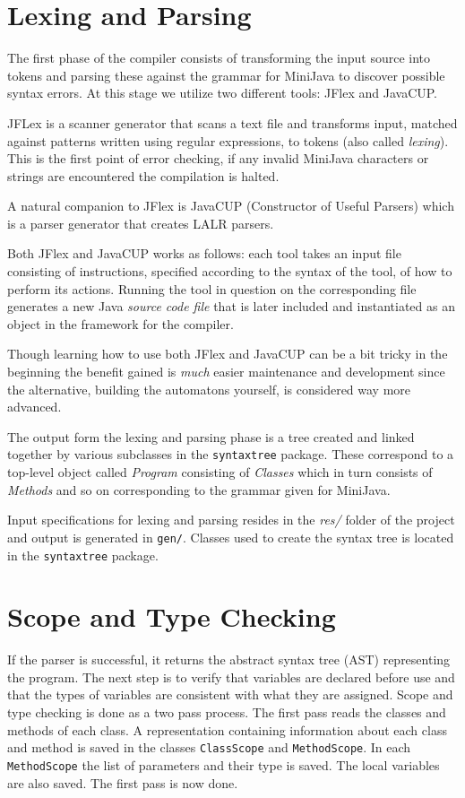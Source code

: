 \documentclass[11pt]{amsart}
\begin{document}
\section{Lexing and Parsing}
The first phase of the compiler consists of transforming the input source into tokens and parsing these against the grammar for MiniJava to discover possible syntax errors. At this stage we utilize two different tools: JFlex and JavaCUP. 

JFLex is a scanner generator that scans a text file and transforms input, matched against patterns written using regular expressions, to tokens (also called \textit{lexing}). This is the first point of error checking, if any invalid MiniJava characters or strings are encountered the compilation is halted.

A natural companion to JFlex is JavaCUP (Constructor of Useful Parsers) which is a parser generator that creates LALR parsers\cite{appel}.

Both JFlex and JavaCUP works as follows: each tool takes an input file consisting of instructions, specified according to the syntax of the tool, of how to perform its actions. Running the tool in question on the corresponding file generates a new Java \textit{source code file} that is later included and instantiated as an object in the framework for the compiler. 

Though learning how to use both JFlex and JavaCUP can be a bit tricky in the beginning the benefit gained is \textit{much} easier maintenance and development since the alternative, building the automatons\cite{automata} yourself, is considered way more advanced.

The output form the lexing and parsing phase is a tree created and linked together by various subclasses in the \texttt{syntaxtree} package. These correspond to a top-level object called \textit{Program} consisting of \textit{Classes} which in turn consists of \textit{Methods} and so on corresponding to the grammar given for MiniJava\cite{grammar}.

Input specifications for lexing and parsing resides in the \textit{res/} folder of the project and output is generated in \texttt{gen/}. Classes used to create the syntax tree is located in the \texttt{syntaxtree} package.

\section{Scope and Type Checking}
	If the parser is successful, it returns the abstract syntax tree (AST) representing the program. The next step is to verify that variables are declared before use and that the types of variables are consistent with what they are assigned. Scope and type checking is done as a two pass process. The first pass reads the classes and methods of each class. A representation containing information about each class and method is saved in the classes \texttt{ClassScope} and \texttt{MethodScope}. In each \texttt{MethodScope} the list of parameters and their type is saved. The local variables are also saved. The first pass is now done.
\end{document}
